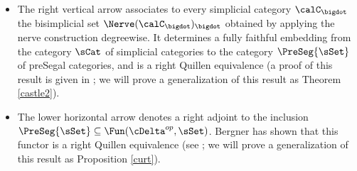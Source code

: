 \begin{theorem}
\begin{itemize}
\item[$(B3)$] The right vertical arrow associates to every simplicial
category $\calC_{\bigdot}$ the bisimplicial set $\Nerve(\calC_{\bigdot})_{\bigdot}$
obtained by applying the nerve construction degreewise. It determines
a fully faithful embedding from the category $\sCat$ of simplicial categories
to the category $\PreSeg{\sSet}$ of preSegal categories, and is a right Quillen equivalence
(a proof of this result is given in \cite{bergner4}; we will prove a generalization of this result as Theorem \ref{castle2}).

\item[$(B4)$] The lower horizontal arrow denotes a right adjoint to the inclusion
$\PreSeg{\sSet} \subseteq \Fun( \cDelta^{op}, \sSet)$. Bergner has shown
that this functor is a right Quillen equivalence (see \cite{bergner4};
we will prove a generalization of this result as Proposition \ref{curt}).
\end{itemize}
\end{theorem}

